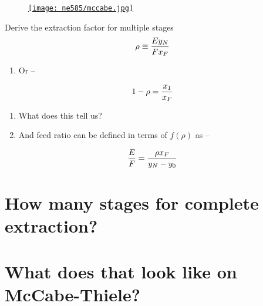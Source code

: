 \documentclass[aspectratio=1610,pdftex,dvipsnames,compress,xcolor={dvipsnames}]{beamer}
\begin{document}
\begin{frame}{}
    \begin{figure}
        \centering
        \href{http://www.tsijournals.com/articles-images/chemical-technology-McCabe-Thiele-uranium-11-5-102-g015.png}{\texttt{[image: ne585/mccabe.jpg]}}
    \end{figure}
\end{frame}


\begin{frame}{Derive the extraction factor for multiple stages}
    \begin{equation}
        \LARGE
        \rho \equiv \frac{Ey_N}{Fx_F}
    \end{equation}
    
    \vspace*{\fill}

    \begin{enumerate}[topsep=0pt,itemsep=18pt,leftmargin=*,label=(\arabic*)]
        \item[]Or -- 
    \end{enumerate}

    \vspace*{\fill}

    \begin{equation}
        \LARGE
        1 - \rho = \frac{x_1}{x_F}
    \end{equation}

    \vspace*{\fill}

    \begin{enumerate}[topsep=0pt,itemsep=18pt,leftmargin=*,label=(\arabic*)]
        \item[]What does this tell us?
        \item[]And feed ratio can be defined in terms of $f(\rho)$ as --
    \end{enumerate}

    \vspace*{\fill}

    \begin{equation}
        \LARGE
        \frac{E}{F} = \frac{\rho x_F}{y_N-y_0}
    \end{equation}
\end{frame}


\section{How many stages for complete extraction?}
\section{What does that look like on McCabe-Thiele?}
\end{document}
